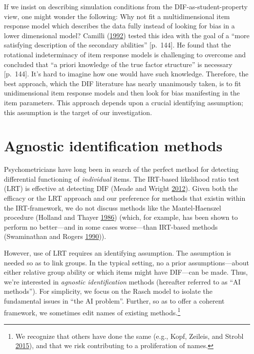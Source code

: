 \documentclass[
  11pt,
]{article}
\begin{document}
If we insist on describing simulation conditions from the DIF-as-student-property view, one might wonder the following: Why not fit a multidimensional item response model which describes the data fully instead of looking for bias in a lower dimensional model? Camilli (\protect\hyperlink{ref-camilli1992conceptual}{1992}) tested this idea with the goal of a \enquote{more satisfying description of the secondary abilities} {[}p.~144{]}. He found that the rotational indeterminacy of item response models is challenging to overcome and concluded that \enquote{a priori knowledge of the true factor structure} is necessary {[}p.~144{]}. It's hard to imagine how one would have such knowledge. Therefore, the best approach, which the DIF literature has nearly unanimously taken, is to fit unidimensional item response models and then look for bias manifesting in the item parameters. This approach depends upon a crucial identifying assumption; this assumption is the target of our investigation.

\hypertarget{agnostic-identification-methods}{%
\section{Agnostic identification methods}\label{agnostic-identification-methods}}

Psychometricians have long been in search of the perfect method for detecting differential functioning of \emph{individual} items. The IRT-based likelihood ratio test (LRT) is effective at detecting DIF (Meade and Wright \protect\hyperlink{ref-meade2012solving}{2012}). Given both the efficacy or the LRT approach and our preference for methods that existin within the IRT-framework, we do not discuss methods like the Mantel-Haenszel procedure (Holland and Thayer \protect\hyperlink{ref-holland1986differential}{1986}) (which, for example, has been shown to perform no better---and in some cases worse---than IRT-based methods (Swaminathan and Rogers \protect\hyperlink{ref-swaminathan1990detecting}{1990})).

However, use of LRT requires an identifying assumption. The assumption is needed so as to link groups. In the typical setting, no a prior assumptions---about either relative group ability or which items might have DIF---can be made. Thus, we're interested in \emph{agnostic identification} methods (hereafter referred to as \enquote{AI methods}). For simplicity, we focus on the Rasch model to isolate the fundamental issues in \enquote{the AI problem}. Further, so as to offer a coherent framework, we sometimes edit names of existing methods.\footnote{We recognize that others have done the same (e.g., Kopf, Zeileis, and Strobl \protect\hyperlink{ref-kopf2015framework}{2015}), and that we risk contributing to a proliferation of names.}
\end{document}
